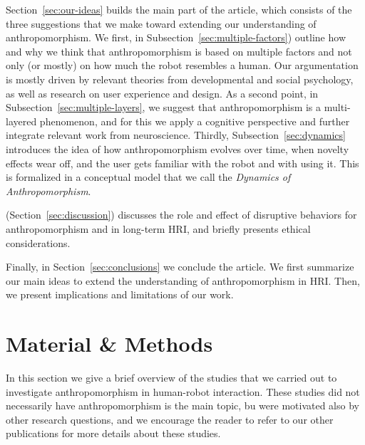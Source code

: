 \documentclass{frontiersSCNS} %
\begin{document}
Section~\ref{sec:our-ideas} builds the main part of the article, which consists of the three suggestions that we make toward extending our understanding of anthropomorphism. We first, in Subsection~\ref{sec:multiple-factors}) outline how and why we think that anthropomorphism is based on multiple factors and not only (or mostly) on how much the robot resembles a human. Our argumentation is mostly driven by relevant theories from developmental and social psychology, as well as research on user experience and design.
As a second point, in Subsection~\ref{sec:multiple-layers}, we suggest that anthropomorphism is a multi-layered phenomenon, and for this we apply a cognitive perspective and further integrate relevant work from neuroscience.
Thirdly, Subsection~\ref{sec:dynamics} introduces the idea of how anthropomorphism evolves over time, when novelty effects wear off, and the user gets familiar with the robot and with using it. This is formalized in a conceptual model that we call the \textit{Dynamics of Anthropomorphism}.

(Section~\ref{sec:discussion}) discusses the role and effect of disruptive behaviors for anthropomorphism and in long-term HRI, and briefly presents ethical considerations. 

Finally, in Section~\ref{sec:conclusions} we conclude the article. We  first summarize our main ideas to extend the understanding of anthropomorphism in HRI. Then, we present implications and limitations of our work. 


%
%
%
%
%
%


\section{Material \& Methods}
\label{sec:material-methods}


In this section we give a brief overview of the studies that we carried out to
investigate anthropomorphism in human-robot interaction. These studies did not necessarily have anthropomorphism is the main topic, bu were motivated also by other research
questions, and we encourage the reader to refer to our other publications for more details about these studies.
\end{document}
